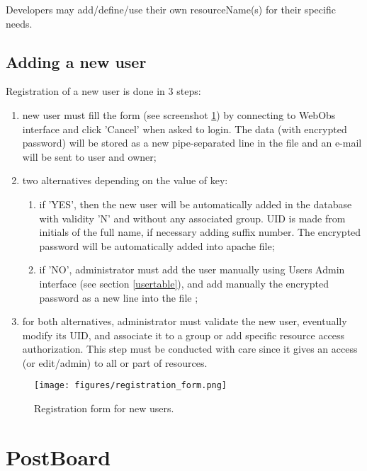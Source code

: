 Developers may add/define/use their own resourceName(s) for their specific needs.


\subsection{Adding a new user}

Registration of a new user is done in 3 steps:

\begin{enumerate}
\item new user must fill the form (see screenshot \ref{regform}) by connecting to WebObs interface and click 'Cancel' when asked to login. The data (with encrypted password) will be stored as a new pipe-separated line in the file  and an e-mail will be sent to user and \webobs owner;
\item two alternatives depending on the value of  key:
	\begin{enumerate}
		\item if 'YES', then the new user will be automatically added in the database with validity 'N' and without any associated group. UID is made from initials of the full name, if necessary adding suffix number. The encrypted password will be automatically added into  apache file;
		\item if 'NO', administrator must add the user manually using Users Admin interface (see section \ref{usertable}), and add manually the encrypted password as a new line into the file ;
	\end{enumerate}
\item for both alternatives, administrator must validate the new user, eventually modify its UID, and associate it to a group or add specific resource access authorization. This step must be conducted with care since it gives an access (or edit/admin) to all or part of \webobs resources.
\end{enumerate}


\begin{figure}
\center
\texttt{[image: figures/registration\_form.png]}
\caption{Registration form for new users.}
\label{regform}
\end{figure}


\section{PostBoard}

